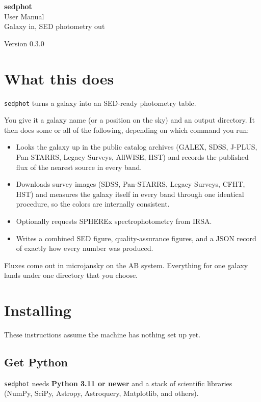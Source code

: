\documentclass[11pt]{article}
\newcommand{\manualname}{sedphot}
\newcommand{\manualtagline}{Galaxy in, SED photometry out}
\newcommand{\manualversion}{0.3.0}
\newcommand{\manualtitlepage}{%
  \thispagestyle{empty}
  \vspace*{4cm}
  \begin{center}
    {\Huge\bfseries\manualname}\\[0.7cm]
    {\Large User Manual}\\[1.3cm]
    {\normalsize\manualtagline}
  \end{center}
  \vfill
  \begin{center}\normalsize Version \manualversion\end{center}
  \newpage
  \tableofcontents
  \newpage
}
\begin{document}
\manualtitlepage

\section{What this does}

\texttt{sedphot} turns a galaxy into an SED-ready photometry table.

You give it a galaxy name (or a position on the sky) and an output
directory. It then does some or all of the following, depending on which
command you run:

\begin{itemize}\sloppy
  \item Looks the galaxy up in the public catalog archives (GALEX, SDSS,
        J-PLUS, Pan-STARRS, Legacy Surveys, AllWISE, HST) and records the
        published flux of the nearest source in every band.
  \item Downloads survey images (SDSS, Pan-STARRS, Legacy Surveys, CFHT,
        HST) and measures the galaxy itself in every band through one
        identical procedure, so the colors are internally consistent.
  \item Optionally requests SPHEREx spectrophotometry from IRSA.
  \item Writes a combined SED figure, quality-assurance figures, and a
        JSON record of exactly how every number was produced.
\end{itemize}

Fluxes come out in microjansky on the AB system. Everything for one
galaxy lands under one directory that you choose.

\section{Installing}

These instructions assume the machine has nothing set up yet.

\subsection{Get Python}

\texttt{sedphot} needs \textbf{Python 3.11 or newer} and a stack of
scientific libraries (NumPy, SciPy, Astropy, Astroquery, Matplotlib, and
others).
\end{document}
